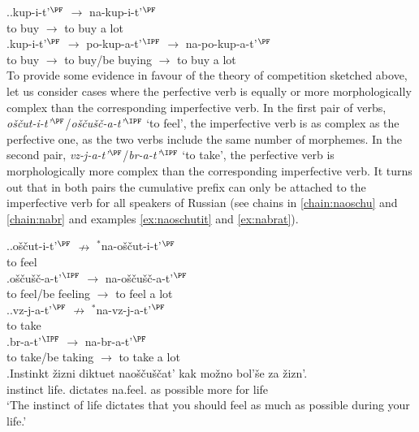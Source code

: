 \ex.\ag.\label{chain:nakupit}kup-i-t'$^{\PF}$ $\rightarrow$ na-kup-i-t'$^{\PF}$\\
{to buy} $\rightarrow$ {to buy a lot}\\
\bg.\label{chain:napokupat}kup-i-t'$^{\PF}$ $\rightarrow$ po-kup-a-t'$^{\IPF}$ $\rightarrow$ na-po-kup-a-t'$^{\PF}$\\
{to buy} $\rightarrow$ {to buy/be buying} $\rightarrow$ {to buy a lot}\\

To provide some evidence in favour of the theory of competition sketched above, let us consider cases where the perfective verb is equally or more morphologically complex than the corresponding imperfective verb. In the first pair of verbs, \textit{o\v{s}\v{c}ut-i-t'}$^{\PF}$\slash\textit{o\v{s}\v{c}u\v{s}\v{c}-a-t'}$^{\IPF}$ `to feel', the imperfective verb is as complex as the perfective one, as the two verbs include the same number of morphemes. In the second pair, \textit{vz-j-a-t'}$^{\PF}$\slash\textit{br-a-t'}$^{\IPF}$ `to take', the perfective verb is morphologically more complex than the corresponding imperfective verb. It turns out that in both pairs the cumulative prefix  can only be attached to the imperfective verb for all speakers of Russian (see chains in \ref{chain:naoschu} and \ref{chain:nabr} and examples \ref{ex:naoschutit} and \ref{ex:nabrat}). 

\ex.\label{chain:naoschu}\ag.o\v{s}\v{c}ut-i-t'$^{\PF}$ $\nrightarrow$ $^*$na-o\v{s}\v{c}ut-i-t'$^{\PF}$\label{chain:oschutit}\\
{to feel} {} {}\\
\bg.\label{chain:oschuschat}o\v{s}\v{c}u\v{s}\v{c}-a-t'$^{\IPF}$ $\rightarrow$ na-o\v{s}\v{c}u\v{s}\v{c}-a-t'$^{\PF}$\\
{to feel/be feeling} $\rightarrow$ {to feel a lot}\\

\ex.\label{chain:nabr}\ag.vz-j-a-t'$^{\PF}$ $\nrightarrow$ $^*$na-vz-j-a-t'$^{\PF}$\label{chain:navzjat}\\
{to take} {} {}\\
\bg.\label{chain:nabrat}br-a-t'$^{\IPF}$ $\rightarrow$ na-br-a-t'$^{\PF}$\\
{to take/be taking} $\rightarrow$ {to take a lot}\\

\exg.\label{ex:naoschutit}Instinkt \v{z}izni diktuet nao\v{s}\v{c}u\v{s}\v{c}at' kak mo\v{z}no bol'\v{s}e za \v{z}izn'.\\
instinct life. dictates na.feel. as possible more for life\\
\trans `The instinct of life dictates that you should feel as much as possible during your life.'\\

